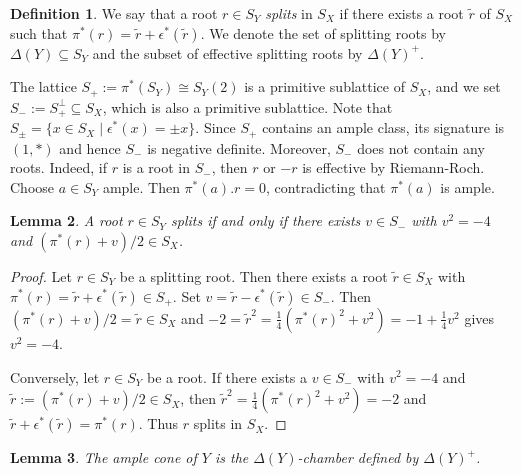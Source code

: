 \documentclass{amsart}
\theoremstyle{definition}
\newtheorem{definition}{Definition}[section]
\theoremstyle{plain}
\newtheorem{lemma}[definition]{Lemma}
\begin{document}
\begin{definition}
We say that a root $r \in S_Y$ \emph{splits} in $S_X$ if there exists a root $\tilde{r}$ of $S_X$ such that $\pi^*(r)= \tilde{r} + \epsilon^*(\tilde{r})$. %
We denote the set of splitting roots by $\Delta(Y)\subseteq S_Y$
and the subset of effective splitting roots by $\Delta(Y)^+$.
\end{definition}
The lattice $S_+:=\pi^*(S_Y)\cong S_Y(2)$ is a primitive sublattice of $S_X$, and we set $S_{-} := S_{+}^\perp \subseteq S_X$, which is also a primitive sublattice. Note that $S_\pm = \{x \in S_X \mid \epsilon^*(x) = \pm x\}$.
Since $S_+$ contains an ample class, its signature is $(1,*)$ and hence $S_-$ is negative definite. Moreover, $S_-$ does not contain any roots. Indeed, if $r$ is a root in $S_-$, then $r$ or $-r$ is effective by Riemann-Roch. Choose $a \in S_Y$ ample. Then $\pi^*(a).r=0$, contradicting that $\pi^*(a)$ is ample.
\begin{lemma}\label{lem:splitting-root}
A root $r \in S_Y$ splits if and only if
there exists $v \in S_{-}$ with $ v^2=-4$ and  $(\pi^*(r)+v)/2 \in S_X$.
\end{lemma}
\begin{proof}
Let $r \in S_Y$ be a splitting root. Then there exists a root $\tilde{r} \in S_X$ with $\pi^*(r) = \tilde{r}+\epsilon^*(\tilde{r}) \in S_+$. %
Set $v = \tilde{r} - \epsilon^*(\tilde{r}) \in S_{-}$. Then $(\pi^*(r) +v)/2 = \tilde{r} \in S_X$ and $-2 = \tilde{r}^2 =\frac{1}{4}\left(\pi^*(r)^2 + v^2\right) = -1 + \frac{1}{4}v^2$ gives $v^2 = -4$.

Conversely, let $r \in S_Y$ be a root. If there exists a $v \in S_{-}$ with $v^2=-4$ and $\tilde{r}:=(\pi^*(r)+v)/2 \in S_X$, then $\tilde{r}^2=\frac{1}{4}\left(\pi^*(r)^2+v^2\right)=-2$ and $\tilde{r} + \epsilon^*(\tilde{r}) =\pi^*(r)$. Thus $r$ splits in $S_X$.
\end{proof}
\begin{lemma}
The ample cone of $Y$ is the $\Delta(Y)$-chamber defined by $\Delta(Y)^+$.
\end{lemma}
\end{document}
